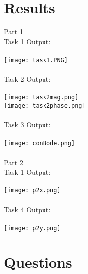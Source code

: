 \documentclass[12pt]{report}
\begin{document}
\section{Results}
Part 1
\\Task 1 Output:
\\
\\ \texttt{[image: task1.PNG]}
\\
\\ Task 2 Output:
\\
\\ \texttt{[image: task2mag.png]}
\\ \texttt{[image: task2phase.png]}
\\
\\ Task 3 Output:
\\
\\ \texttt{[image: conBode.png]}
\\
\\ Part 2
\\Task 1 Output:
\\ 
\\ \texttt{[image: p2x.png]}
\\
\\ Task 4 Output:
\\
\\ \texttt{[image: p2y.png]}


\section{Questions}
\end{document}
